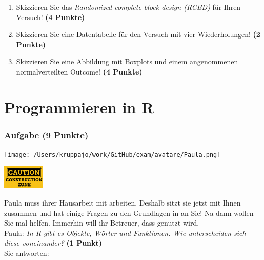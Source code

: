 \documentclass[a4paper, 9pt]{scrartcl}\usepackage[]{graphicx}\usepackage[]{xcolor}
\begin{document}
\begin{enumerate}
  \setcounter{enumi}{0}
\item Skizzieren Sie das \textit{Randomized complete block design (RCBD)} für Ihren Versuch! \textbf{(4 Punkte)}
\item Skizzieren Sie eine Datentabelle für den Versuch mit vier Wiederholungen! \textbf{(2 Punkte)}
\item Skizzieren Sie eine Abbildung mit Boxplots und einem angenommenen normalverteilten Outcome! \textbf{(4 Punkte)}
\end{enumerate}


 
\clearpage
\part{Programmieren in R}

\section{Aufgabe \hfill (9 Punkte)}



 
\begin{minipage}[t]{0.5\textwidth}
\texttt{[image: /Users/kruppajo/work/GitHub/exam/avatare/Paula.png]}
\end{minipage}
\begin{minipage}[t]{0.5\textwidth}
\hfill
\href{https://youtu.be/C9skfFRTHhI}{\includegraphics[width = 2cm]{img/caution}}
\end{minipage}
\vspace{1ex}



Paula muss ihrer Hausarbeit mit \Rlogo arbeiten. Deshalb sitzt sie jetzt mit Ihnen zusammen und hat einige Fragen zu den Grundlagen in \Rlogo an Sie! Na dann wollen Sie mal helfen. Immerhin will ihr Betreuer, dass \Rlogo genutzt wird.\\[1Ex]

Paula: \textit{In R gibt es Objekte, Wörter und Funktionen. Wie unterscheiden sich diese voneinander?} \textbf{(1 Punkt)}\\[1ex]
Sie antworten:\\[2Ex]
\end{document}
